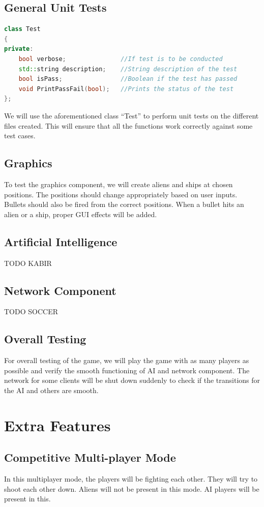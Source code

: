 \documentclass{article}
\begin{document}
			\subsection{General Unit Tests}
				\begin{lstlisting}[language=C++, caption={Class Parameters for Test}]
class Test
{
private:
	bool verbose;               //If test is to be conducted
	std::string description;    //String description of the test
	bool isPass;                //Boolean if the test has passed 
	void PrintPassFail(bool);   //Prints the status of the test
};
				\end{lstlisting}

				We will use the aforementioned class ``Test'' to perform unit tests on the different files created. This will ensure that all the functions work correctly against some test cases.

			\subsection{Graphics}
				To test the graphics component, we will create aliens and ships at chosen positions. The positions should change appropriately based on user inputs. Bullets should also be fired from the correct positions. When a bullet hits an alien or a ship, proper GUI effects will be added.
			\subsection{Artificial Intelligence}
				TODO KABIR
			\subsection{Network Component}
				TODO SOCCER
			\subsection{Overall Testing}
				For overall testing of the game, we will play the game with as many players as possible and verify the smooth functioning of AI and network component. The network for some clients will be shut down suddenly to check if the transitions for the AI and others are smooth.
	\section{Extra Features}
		\subsection{Competitive Multi-player Mode}
			In this multiplayer mode, the players will be fighting each other. They will try to shoot each other down. Aliens will not be present in this mode. AI players will be present in this.
\end{document}
